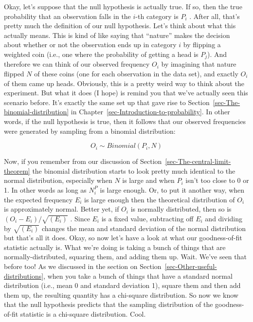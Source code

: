 \documentclass[
  a4paper,
]{book}
\begin{document}
Okay, let's suppose that the null hypothesis is actually true. If so,
then the true probability that an observation falls in the \(i\)-th
category is \(P_i\) . After all, that's pretty much the definition of
our null hypothesis. Let's think about what this actually means. This is
kind of like saying that ``nature'' makes the decision about whether or
not the observation ends up in category \(i\) by flipping a weighted
coin (i.e., one where the probability of getting a head is \(P_j\)). And
therefore we can think of our observed frequency \(O_i\) by imagining
that nature flipped \(N\) of these coins (one for each observation in
the data set), and exactly \(O_i\) of them came up heads. Obviously,
this is a pretty weird way to think about the experiment. But what it
does (I hope) is remind you that we've actually seen this scenario
before. It's exactly the same set up that gave rise to
Section~\ref{sec-The-binomial-distribution} in
Chapter~\ref{sec-Introduction-to-probability}. In other words, if the
null hypothesis is true, then it follows that our observed frequencies
were generated by sampling from a binomial distribution:

\[O_i \sim Binomial(P_i,N) \]

Now, if you remember from our discussion of
Section~\ref{sec-The-central-limit-theorem} the binomial distribution
starts to look pretty much identical to the normal distribution,
especially when \(N\) is large and when \(P_i\) isn't too close to 0 or
1. In other words as long as \(N^P_i\) is large enough. Or, to put it
another way, when the expected frequency \(E_i\) is large enough then
the theoretical distribution of \(O_i\) is approximately normal. Better
yet, if \(O_i\) is normally distributed, then so is
\((O_i-E_i)/\sqrt{(E_i)}\) . Since \(E_i\) is a fixed value, subtracting
off \(E_i\) and dividing by \(\sqrt{(E_i)}\) changes the mean and
standard deviation of the normal distribution but that's all it does.
Okay, so now let's have a look at what our goodness-of-fit statistic
actually is. What we're doing is taking a bunch of things that are
normally-distributed, squaring them, and adding them up. Wait. We've
seen that before too! As we discussed in the section on
Section~\ref{sec-Other-useful-distributions}, when you take a bunch of
things that have a standard normal distribution (i.e., mean 0 and
standard deviation 1), square them and then add them up, the resulting
quantity has a chi-square distribution. So now we know that the null
hypothesis predicts that the sampling distribution of the
goodness-of-fit statistic is a chi-square distribution. Cool.
\end{document}

